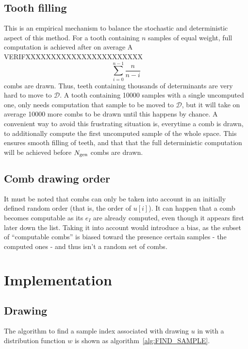 \documentclass[./thesis.tex]{subfiles}
\begin{document}
\subsection{Tooth filling}

This is an empirical mechanism to balance the stochastic and deterministic aspect of this method. For a tooth containing $n$ samples of equal weight, full computation is achieved after on average \alert{A VERIFXXXXXXXXXXXXXXXXXXXXXXX}
\begin{equation}
\sum_{i=0}^{n-1} \frac{n}{n-i}
\end{equation}
combs are drawn. Thus, teeth containing thousands of determinants are very hard to move to $\mathcal{D}$. A tooth containing 10000 samples with a single uncomputed one, only needs computation that sample to be moved to $\mathcal{D}$, but it will take on average 10000 more combs to be drawn until this happens by chance.
A convenient way to avoid this frustrating situation is, everytime a comb is drawn, to additionally compute the first uncomputed sample of the whole space. This ensures smooth filling of teeth, and that that the full deterministic computation will be achieved before ${N_\text{gen}}$ combs are drawn.


\subsection{Comb drawing order}

It must be noted that combs can only be taken into account in an initially defined random order (that is, the order of $u[i]$).
It can happen that a comb becomes computable as its $e_I$ are already computed, even though it appears first later down the list. Taking it into account would introduce a bias, as the subset of ``computable combs'' is biased toward the presence certain samples - the computed ones - and thus isn't a random set of combs.


\section{Implementation}


\subsection{Drawing}

The algorithm to find a sample index associated with drawing $u$ in with a distribution function $w$ is shown as algorithm~\ref{alg:FIND_SAMPLE}.
\end{document}
